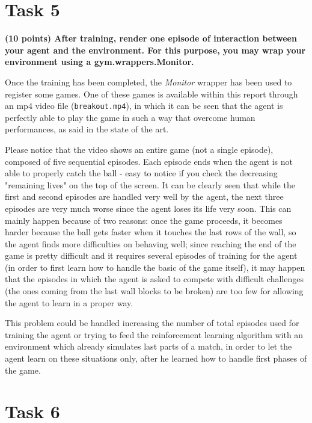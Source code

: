 \documentclass[12pt]{article}
\begin{document}
\section*{Task 5}

\textbf{(10 points) After training, render one episode of interaction between your agent and the environment. For this purpose, you may wrap your environment using a gym.wrappers.Monitor.}

Once the training has been completed, the \textit{Monitor} wrapper has been used to register some games. One of these games is available within this report through an mp4 video file (\texttt{breakout.mp4}), in which it can be seen that the agent is perfectly able to play the game in such a way that overcome human performances, as said in the state of the art.

Please notice that the video shows an entire game (not a single episode), composed of five sequential episodes. Each episode ends when the agent is not able to properly catch the ball - easy to notice if you check the decreasing "remaining lives" on the top of the screen. It can be clearly seen that while the first and second episodes are handled very well by the agent, the next three episodes are very much worse since the agent loses its life very soon. This can mainly happen because of two reasons: once the game proceeds, it becomes harder because the ball gets faster when it touches the last rows of the wall, so the agent finds more difficulties on behaving well; since reaching the end of the game is pretty difficult and it requires several episodes of training for the agent (in order to first learn how to handle the basic of the game itself), it may happen that the episodes in which the agent is asked to compete with difficult challenges (the ones coming from the last wall blocks to be broken) are too few for allowing the agent to learn in a proper way. 

This problem could be handled increasing the number of total episodes used for training the agent or trying to feed the reinforcement learning algorithm with an environment which already simulates last parts of a match, in order to let the agent learn on these situations only, after he learned how to handle first phases of the game.



\section*{Task 6}
\end{document}
